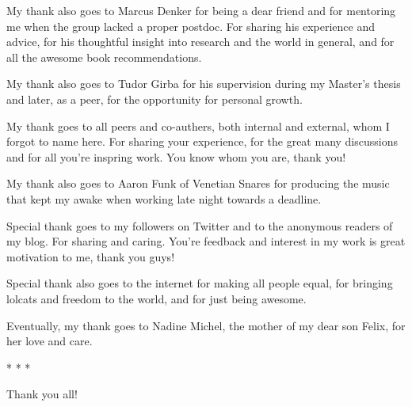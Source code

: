 My thank also goes to Marcus Denker for being a dear friend and for mentoring me when the group lacked a proper postdoc. For sharing his experience and advice, for his thoughtful insight into research and the world in general, and for all the awesome book recommendations. 

My thank also goes to Tudor Girba for his supervision during my Master's thesis and later, as a peer, for the opportunity for personal growth.

My thank goes to all peers and co-authers, both internal and external, whom I forgot to name here. For sharing your experience, for the great many discussions and for all you're inspring work. You know whom you are, thank you!

My thank also goes to Aaron Funk of Venetian Snares for producing the music that kept my awake when working late night towards a deadline. 

Special thank goes to my followers on Twitter and to the anonymous readers of my blog. For sharing and caring. You're feedback and interest in my work is great motivation to me, thank you guys!

Special thank also goes to the internet for making all people equal, for bringing lolcats and freedom to the world, and for just being awesome.

Eventually, my thank goes to Nadine Michel, the mother of my dear son Felix, for her love and care. 

\begin{center}* * *\end{center}

Thank you all!
